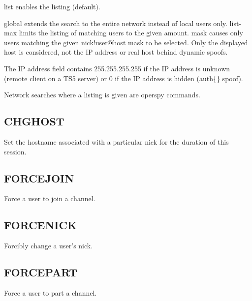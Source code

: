 	list enables the listing (default).

	global extends the search to the entire network instead of local users
	only. list-{}max limits the listing of matching users to the given
	amount.	mask causes only users matching the given nick!user@host mask
	to be selected. Only the displayed host is considered, not the
	IP address or real host behind dynamic spoofs.

	The IP address field contains 255.255.255.255 if the IP address
	is unknown (remote client on a TS5 server) or 0 if the IP address
	is hidden (auth\{\} spoof).

	Network searches where a listing is given are operspy commands.

\subsection{CHGHOST}

	 

	Set the hostname associated with a particular nick for the duration of
	this session.

\subsection{FORCEJOIN}

  
	       Force a user to join a channel.


\subsection{FORCENICK}

  

	       Forcibly change a user's nick.


\subsection{FORCEPART}

  
	       Force a user to part a channel.



